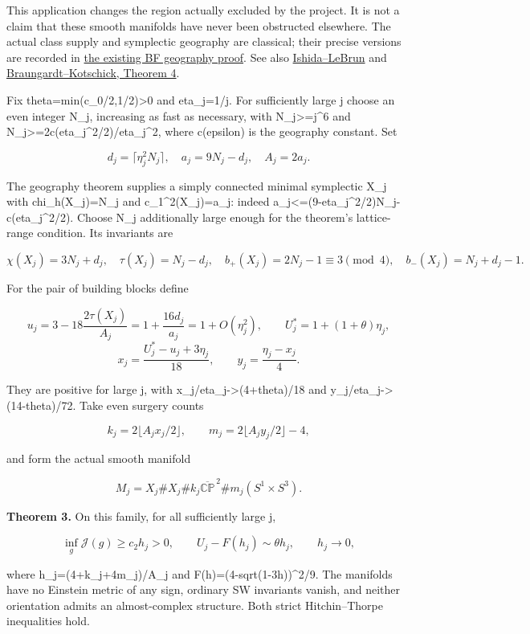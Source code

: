 \documentclass[
  10pt,
]{article}
\begin{document}
This application changes the region actually excluded by the project. It
is not a claim that these smooth manifolds have never been obstructed
elsewhere. The actual class supply and symplectic geography are
classical; their precise versions are recorded in
\href{../mathematics/current/line1_bauer_furuta_geography.md}{the
existing BF geography proof}. See also
\href{https://arxiv.org/html/math/0111228}{Ishida--LeBrun} and
\href{https://arxiv.org/pdf/math/0306021}{Braungardt--Kotschick, Theorem
4}.

Fix theta=min(c\_0/2,1/2)\textgreater0 and eta\_j=1/j. For sufficiently
large j choose an even integer N\_j, increasing as fast as necessary,
with N\_j\textgreater=j\^{}6 and
N\_j\textgreater=2c(eta\_j\^{}2/2)/eta\_j\^{}2, where c(epsilon) is the
geography constant. Set

\[
 d_j=\lceil\eta_j^2N_j\rceil,\quad a_j=9N_j-d_j,
 \quad A_j=2a_j.
\]

The geography theorem supplies a simply connected minimal symplectic
X\_j with chi\_h(X\_j)=N\_j and c\_1\^{}2(X\_j)=a\_j: indeed
a\_j\textless=(9-eta\_j\^{}2/2)N\_j-c(eta\_j\^{}2/2). Choose N\_j
additionally large enough for the theorem's lattice-range condition. Its
invariants are

\[
 \chi(X_j)=3N_j+d_j,\quad \tau(X_j)=N_j-d_j,\quad
 b_+(X_j)=2N_j-1\equiv3\pmod4,\quad b_-(X_j)=N_j+d_j-1.
\]

For the pair of building blocks define

\[
 u_j=3-18\frac{2\tau(X_j)}{A_j}
     =1+\frac{16d_j}{a_j}=1+O(\eta_j^2),\qquad
 U_j^*=1+(1+\theta)\eta_j,
\] \[
 x_j=\frac{U_j^*-u_j+3\eta_j}{18},\qquad
 y_j=\frac{\eta_j-x_j}{4}.
\]

They are positive for large j, with x\_j/eta\_j-\textgreater(4+theta)/18
and y\_j/eta\_j-\textgreater(14-theta)/72. Take even surgery counts

\[
 k_j=2\lfloor A_jx_j/2\rfloor,\qquad
 m_j=2\lfloor A_jy_j/2\rfloor-4,
\]

and form the actual smooth manifold

\[
 M_j=X_j\#X_j\#k_j\overline{\mathbb {CP}}^{\,2}
                         \#m_j(S^1\times S^3).         \tag{4.1}
\]

\textbf{Theorem 3.} On this family, for all sufficiently large j,

\[
 \inf_g\mathcal J(g)\ge c_2h_j>0,\qquad
 U_j-F(h_j)\sim\theta h_j,
 \qquad h_j\longrightarrow0,                           \tag{4.2}
\]

where h\_j=(4+k\_j+4m\_j)/A\_j and F(h)=(4-sqrt(1-3h))\^{}2/9. The
manifolds have no Einstein metric of any sign, ordinary SW invariants
vanish, and neither orientation admits an almost-complex structure. Both
strict Hitchin--Thorpe inequalities hold.
\end{document}
